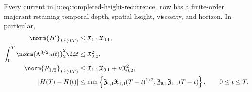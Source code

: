 {\begin{theorem}
Every current in \eqref{u:eq:completed-height-recurrence} now has a
finite-order majorant retaining temporal depth, spatial height, viscosity,
and horizon.
In particular,
\begin{align}
 \norm{H'}_{L^1(0,T)}
 &\le\mathfrak X_{1,1}\mathfrak X_{0,1},
 \label{u:eq:qc-sharp-height-variation}\\
 \int_0^T\norm{\Lambda^{3/2}u(t)}_2^2\dd t
 &\le\mathfrak X_{0,2}^2,
 \label{u:eq:qc-sharp-critical-dissipation}\\
 \norm{\mathcal P_{1/2}}_{L^1(0,T)}
 &\le\mathfrak X_{1,1}\mathfrak X_{0,1}
 +\nu\mathfrak X_{0,2}^2,
 \label{u:eq:qc-sharp-critical-current}\\
 |H(T)-H(t)|
 &\le\min\left\{
 \mathfrak Z_{0,1}\mathfrak X_{1,1}(T-t)^{1/2},
 \mathfrak Z_{0,1}\mathfrak Z_{1,1}(T-t)
 \right\},
 \qquad 0\le t\le T.
 \label{u:eq:qc-sharp-critical-modulus}
\end{align}


\end{theorem}}
